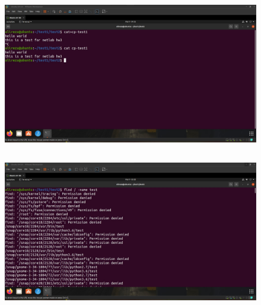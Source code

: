 \documentclass{article}
\begin{document}
\subsection{}
\begin{figure}[H]
    \centering
    \includegraphics[width=1.0\textwidth]{figures/3e.jpg}
    \caption
	{
	}
    \label{fig:fig1}
\end{figure}

\subsection{}
\begin{figure}[H]
    \centering
    \includegraphics[width=1.0\textwidth]{figures/3f.jpg}
    \caption
	{
	}
    \label{fig:fig1}
\end{figure}
\end{document}
